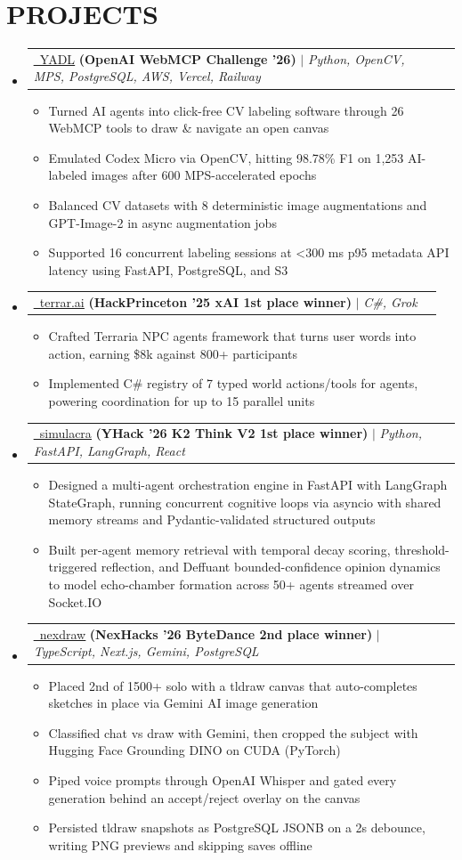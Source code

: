 \documentclass[letterpaper,11pt]{article}
\makeatletter
\newcommand{\resumeItem}[1]{
  \item\small{
    {#1 \vspace{-4pt}}
  }
}
\newcommand{\resumeProjectHeading}[2]{
    \item
    \begin{tabular*}{0.97\textwidth}[t]{l@{\extracolsep{\fill}}r}
      #1 & #2 \\
    \end{tabular*}\vspace{-7pt}
}
\newcommand{\resumeSubHeadingListStart}{\begin{itemize}[leftmargin=0.15in, label={}]}
\newcommand{\resumeSubHeadingListEnd}{\end{itemize}}
\newcommand{\resumeItemListStart}{\begin{itemize}}
\newcommand{\resumeItemListEnd}{\end{itemize}\vspace{-6pt}}
\makeatother
\begin{document}
\section{\textbf{PROJECTS}}
    \resumeSubHeadingListStart
    \resumeProjectHeading
  {\href{https://github.com/0xABAN/YADL}{\textcolor{linkblue}{\underline{\faGithub\ YADL}}} \textbf{(OpenAI WebMCP Challenge '26)}
  $|$
  \emph{Python, OpenCV, MPS, PostgreSQL, AWS, Vercel, Railway}
  }
  {}
  \resumeItemListStart
    \resumeItem{Turned AI agents into click-free CV labeling software through 26 WebMCP tools to draw \& navigate an open canvas}
    \resumeItem{Emulated Codex Micro via OpenCV, hitting 98.78\% F1 on 1,253 AI-labeled images after 600 MPS-accelerated epochs}
    \resumeItem{Balanced CV datasets with 8 deterministic image augmentations and GPT-Image-2 in async augmentation jobs}
    \resumeItem{Supported 16 concurrent labeling sessions at \textless{}300 ms p95 metadata API latency using FastAPI, PostgreSQL, and S3}
  \resumeItemListEnd
    \resumeProjectHeading
  {\href{https://github.com/SlothfulDreams/terrar.ai}{\textcolor{linkblue}{\underline{\faGithub\ terrar.ai}}} \textbf{(HackPrinceton '25 xAI 1st place winner)}
  $|$
  \emph{C\#, Grok}
  }
  {}
  \resumeItemListStart
    \resumeItem{Crafted Terraria NPC agents framework that turns user words into action, earning \$8k against 800+ participants}
    \resumeItem{Implemented C\# registry of 7 typed world actions/tools for agents, powering coordination for up to 15 parallel units}
  \resumeItemListEnd
     \resumeProjectHeading
  {\href{https://github.com/AdamPSU/simulacra}{\textcolor{linkblue}{\underline{\faGithub\ simulacra}}} \textbf{(YHack '26 K2 Think V2 1st place winner)}
  $|$
  \emph{Python, FastAPI, LangGraph, React}
  }{}
  \resumeItemListStart
    \resumeItem{Designed a multi-agent orchestration engine in FastAPI with LangGraph StateGraph, running concurrent cognitive loops via asyncio with shared memory streams and Pydantic-validated structured outputs}
    \resumeItem{Built per-agent memory retrieval with temporal decay scoring, threshold-triggered reflection, and Deffuant bounded-confidence opinion dynamics to model echo-chamber formation across 50+ agents streamed over Socket.IO}
  \resumeItemListEnd
    \resumeProjectHeading
  {\href{https://github.com/AdamPSU/maestro}{\textcolor{linkblue}{\underline{\faGithub\ nexdraw}}} \textbf{(NexHacks '26 ByteDance 2nd place winner)}
  $|$
  \emph{TypeScript, Next.js, Gemini, PostgreSQL}
  }
  {}
  \resumeItemListStart
    \resumeItem{Placed 2nd of 1500+ solo with a tldraw canvas that auto-completes sketches in place via Gemini AI image generation}
    \resumeItem{Classified chat vs draw with Gemini, then cropped the subject with Hugging Face Grounding DINO on CUDA (PyTorch)}
    \resumeItem{Piped voice prompts through OpenAI Whisper and gated every generation behind an accept/reject overlay on the canvas}
    \resumeItem{Persisted tldraw snapshots as PostgreSQL JSONB on a 2s debounce, writing PNG previews and skipping saves offline}
  \resumeItemListEnd
    \resumeSubHeadingListEnd
\end{document}
